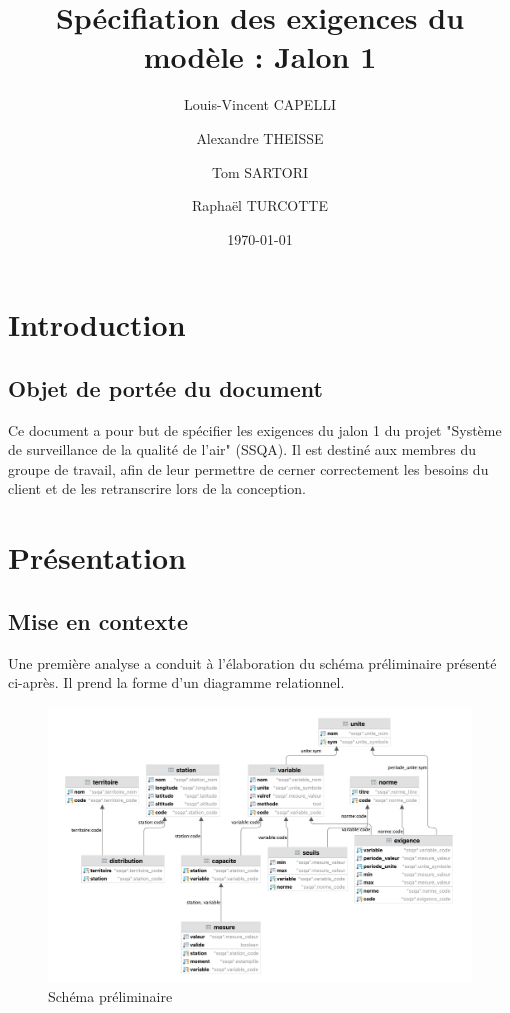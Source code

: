 \documentclass{article}
\begin{document}
\title{Spécifiation des exigences du modèle : Jalon 1}

\author{Louis-Vincent CAPELLI \and Alexandre THEISSE \and Tom SARTORI \and Raphaël TURCOTTE}
\date{\today}
\maketitle
\newpage

\tableofcontents
\newpage

\section{Introduction}
\subsection*{Objet de portée du document}
Ce document a pour but de spécifier les exigences du jalon 1 du projet "Système
de surveillance de la qualité de l'air" (SSQA). Il est destiné aux membres du 
groupe de travail, afin de leur permettre de cerner correctement les besoins
du client et de les retranscrire lors de la conception.

\section{Présentation}
\subsection{Mise en contexte}
Une première analyse a conduit à l'élaboration du schéma préliminaire présenté ci-après.
Il prend la forme d'un diagramme relationnel.

\begin{figure}[h]
\centering
\includegraphics[scale=0.4]{preli.png}
\caption{Schéma préliminaire}
\end{figure}
\end{document}
